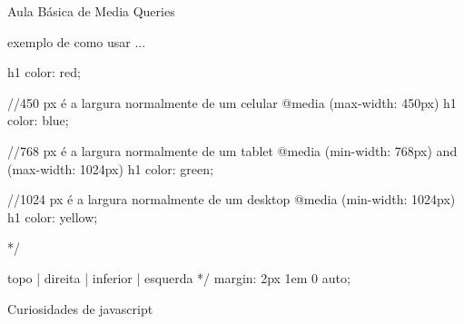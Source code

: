 Aula Básica de Media Queries

exemplo de como usar ...


    h1 {
        color: red;
    }


    //450 px é a largura normalmente de um celular
    @media (max-width: 450px) {
        h1 {
            color: blue;
        }
    }
   

    //768 px é a largura normalmente de um tablet
    @media (min-width: 768px) and (max-width: 1024px){
        h1 {
            color: green;
        }
    }

    //1024 px é a largura normalmente de um desktop
    @media (min-width: 1024px) {
        h1 {
            color: yellow;
        }
    }

*/




topo | direita | inferior | esquerda */
margin: 2px 1em 0 auto;


Curiosidades de javascript


